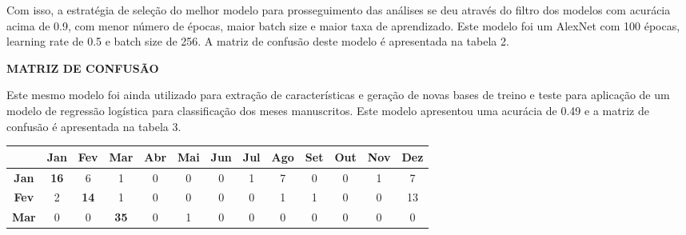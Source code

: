 Com isso, a estratégia de seleção do melhor modelo para prosseguimento das análises se deu através do filtro dos modelos com acurácia acima de 0.9, com menor número de épocas, maior batch size e maior taxa de aprendizado. Este modelo foi um AlexNet com 100 épocas, learning rate de 0.5 e batch size de 256. A matriz de confusão deste modelo é apresentada na tabela 2.

\textbf{MATRIZ DE CONFUSÃO}

Este mesmo modelo foi ainda utilizado para extração de características e geração de novas bases de treino e teste para aplicação de um modelo de regressão logística para classificação dos meses manuscritos. Este modelo apresentou uma acurácia de 0.49 e a matriz de confusão é apresentada na tabela 3.

\begin{table}[h]
\centering
\begin{tabular}{c|cccccccccccc}
\textbf{}    & \textbf{Jan}                     & \textbf{Fev}                     & \textbf{Mar}                     & \textbf{Abr}                     & \textbf{Mai}                    & \textbf{Jun}                    & \textbf{Jul}                     & \textbf{Ago}                     & \textbf{Set}                     & \textbf{Out}                     & \textbf{Nov}                    & \textbf{Dez}                     \\ \hline
\textbf{Jan} & \multicolumn{1}{c|}{\textbf{16}} & 6                                & 1                                & 0                                & 0                               & 0                               & 1                                & 7                                & 0                                & 0                                & 1                               & 7                                \\ \cline{2-3}
\textbf{Fev} & \multicolumn{1}{c|}{2}           & \multicolumn{1}{c|}{\textbf{14}} & 1                                & 0                                & 0                               & 0                               & 0                                & 1                                & 1                                & 0                                & 0                               & 13                               \\ \cline{3-4}
\textbf{Mar} & 0                                & \multicolumn{1}{c|}{0}           & \multicolumn{1}{c|}{\textbf{35}} & 0                                & 1                               & 0                               & 0                                & 0                                & 0                                & 0                                & 0                               & 0                                \\ \cline{4-5}

\end{tabular}
\end{table}

